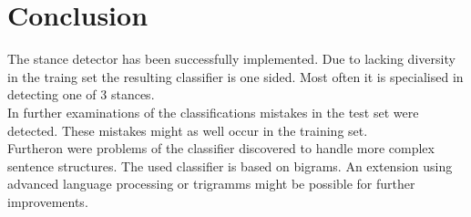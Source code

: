 \documentclass[a4paper,12pt,twoside]{article}
\begin{document}
\section{Conclusion}
The stance detector has been successfully implemented. Due to lacking diversity in the traing set the resulting classifier is one sided. Most often it is specialised in detecting one of 3 stances.\\
In further examinations of the classifications mistakes in the test set were detected. These mistakes might as well occur in the training set.\\
Furtheron were problems of the classifier discovered to handle more complex sentence structures. The used classifier is based on bigrams. An extension using advanced language processing or trigramms might be possible for further improvements. \\


 
\end{document}
